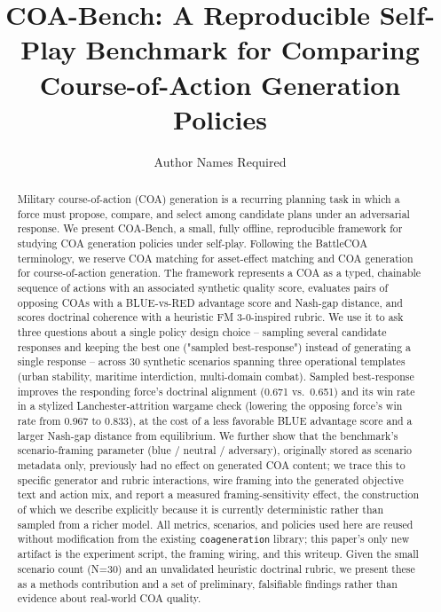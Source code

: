 \documentclass[sigconf]{acmart}
\title{COA-Bench: A Reproducible Self-Play Benchmark for Comparing Course-of-Action Generation Policies}
\author{Author Names Required}
\affiliation{%
  \institution{Organization Required}
  \city{City Required}
  \country{Country Required}}
\begin{document}
\begin{abstract}
Military course-of-action (COA) generation is a recurring planning task in which a force must propose, compare, and select among candidate plans under an adversarial response. We present COA-Bench, a small, fully offline, reproducible framework for studying COA generation policies under self-play. Following the BattleCOA terminology, we reserve COA matching for asset-effect matching and COA generation for course-of-action generation. The framework represents a COA as a typed, chainable sequence of actions with an associated synthetic quality score, evaluates pairs of opposing COAs with a BLUE-vs-RED advantage score and Nash-gap distance, and scores doctrinal coherence with a heuristic FM 3-0-inspired rubric. We use it to ask three questions about a single policy design choice -- sampling several candidate responses and keeping the best one ("sampled best-response") instead of generating a single response -- across 30 synthetic scenarios spanning three operational templates (urban stability, maritime interdiction, multi-domain combat). Sampled best-response improves the responding force's doctrinal alignment (0.671 vs.\ 0.651) and its win rate in a stylized Lanchester-attrition wargame check (lowering the opposing force's win rate from 0.967 to 0.833), at the cost of a less favorable BLUE advantage score and a larger Nash-gap distance from equilibrium. We further show that the benchmark's scenario-framing parameter (blue / neutral / adversary), originally stored as scenario metadata only, previously had no effect on generated COA content; we trace this to specific generator and rubric interactions, wire framing into the generated objective text and action mix, and report a measured framing-sensitivity effect, the construction of which we describe explicitly because it is currently deterministic rather than sampled from a richer model. All metrics, scenarios, and policies used here are reused without modification from the existing \texttt{coageneration} library; this paper's only new artifact is the experiment script, the framing wiring, and this writeup. Given the small scenario count (N=30) and an unvalidated heuristic doctrinal rubric, we present these as a methods contribution and a set of preliminary, falsifiable findings rather than evidence about real-world COA quality.
\end{abstract}

\end{document}
